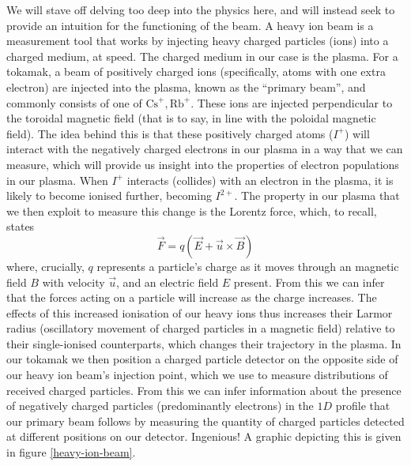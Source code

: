 We will stave off delving too deep into the physics here, and will instead seek to provide an intuition for 
the functioning of the beam. A heavy ion beam is a measurement tool that works by injecting heavy charged 
particles (ions) into a charged medium, at speed. The charged medium in our case is the plasma. For a tokamak, 
a beam of positively charged ions (specifically, atoms with one extra electron) are injected into the plasma, 
known as the ``primary beam'', and commonly consists of one of $\text{Cs}^{+}, \text{Rb}^{+}$. These 
ions are injected perpendicular to the toroidal magnetic field (that is to say, in line with the poloidal 
magnetic field). The idea behind this is that these positively charged atoms ($I^{+}$) will interact with the negatively charged 
electrons in our plasma in a way that we can measure, which will provide us insight into the properties 
of electron populations in our plasma. When $I^{+}$ interacts (collides) with an electron in the plasma, 
it is likely to become ionised further, becoming $I^{2+}$. The property in our plasma that we then 
exploit to measure this change is the Lorentz force, which, to recall, states 
$$\vec{F} = q(\vec{E} + \vec{u} \times \vec{B})$$
where, crucially, $q$ represents a particle's charge as it moves through an magnetic field $B$ with velocity $\vec{u}$, and an electric field $E$ present. 
From this we can infer that the forces acting on a particle will increase as the charge 
increases. The effects of this increased ionisation of our heavy ions thus increases their Larmor radius
(oscillatory movement of charged particles in a magnetic field) relative to their single-ionised counterparts, 
which changes their trajectory in the plasma. In our tokamak we then position a charged particle detector on the opposite 
side of our heavy ion beam's injection point, which we use to measure distributions of received charged 
particles. From this we can infer information about the presence of negatively charged particles 
(predominantly electrons) in the $1D$ profile that our primary beam follows by measuring the 
quantity of charged particles detected at different positions on our detector. Ingenious! A graphic depicting this 
is given in figure \ref{heavy-ion-beam}.

